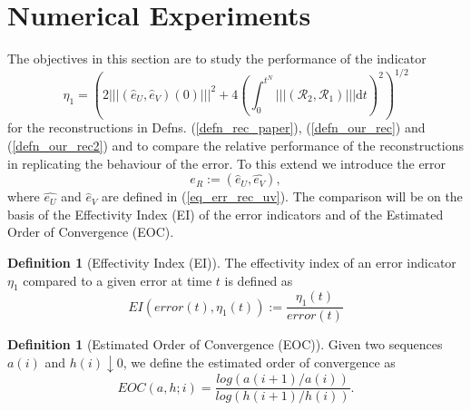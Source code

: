 \documentclass[12pt,a4paper]{article}
\numberwithin{equation}{section}
\theoremstyle{definition}
\newcommand{\pnorm}[1]{\left|\left|\left|#1\right|\right|\right|}
\newcommand{\qp}[1]{\left(#1\right)}
\newtheorem{Defn}[subsection]{Definition}
\begin{document}
\section{Numerical Experiments}\label{sec_num_exp}
The objectives in this section are to study the performance of the indicator 
\begin{equation}\label{eq_bound_test}
\eta_1=\qp{2\pnorm{\qp{\hat{e}_U,\hat{e}_V}\qp{0}}^2+
	4\qp{\int_0^{t^N}\pnorm{\qp{\mathcal{R}_2,\mathcal{R}_1}}\mathrm{d}t}^2}^{1/2}
\end{equation}
for the reconstructions in Defns. (\ref{defn_rec_paper}), (\ref{defn_our_rec}) and (\ref{defn_our_rec2}) and to compare the relative performance of the reconstructions in replicating the behaviour of the error.  To this extend we introduce the error
\begin{equation}\label{eq_error_eR}
e_R :=\qp{\hat{e}_U,\hat{e_V}},
\end{equation}
where $\hat{e_U}$ and $\hat{e}_V$ are defined in (\ref{eq_err_rec_uv}).  
The comparison will be on the basis of the Effectivity Index (EI) of the error indicators and of the Estimated Order of Convergence (EOC).
\begin{Defn}[Effectivity Index (EI)] The effectivity index of an error indicator $\eta_1$ compared to a given error at time $t$ is defined as
\begin{equation}\label{eq_EI}
EI\qp{error\qp{t}, \eta_1\qp{t}} := \frac{\eta_1\qp{t}}{error\qp{t}}
\end{equation}
\end{Defn}

\begin{Defn}[Estimated Order of Convergence (EOC)] Given two sequences $a\qp{i}$ and $h\qp{i}\downarrow 0$, we define the estimated order of convergence as
\begin{equation}
EOC\qp{a,h;i} = \frac{log\qp{a\qp{i+1}/a\qp{i}}}{log\qp{h\qp{i+1}/h\qp{i}}}.
\end{equation}
\end{Defn}
\end{document}
